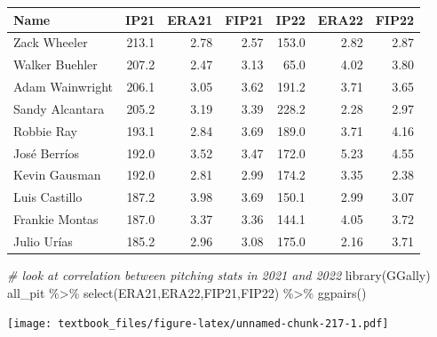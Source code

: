 \documentclass[
  11pt,
]{book}
\newenvironment{Shaded}{\begin{snugshade}}{\end{snugshade}}
\newcommand{\CommentTok}[1]{\textcolor[rgb]{0.56,0.35,0.01}{\textit{#1}}}
\newcommand{\FunctionTok}[1]{\textcolor[rgb]{0.00,0.00,0.00}{#1}}
\newcommand{\NormalTok}[1]{#1}
\newcommand{\SpecialCharTok}[1]{\textcolor[rgb]{0.00,0.00,0.00}{#1}}
\theoremstyle{definition}
\theoremstyle{definition}
\theoremstyle{definition}
\theoremstyle{definition}
\theoremstyle{remark}
\begin{document}
\begin{tabular}{lrrrrrr}
\toprule
Name & IP21 & ERA21 & FIP21 & IP22 & ERA22 & FIP22\\
\midrule
Zack Wheeler & 213.1 & 2.78 & 2.57 & 153.0 & 2.82 & 2.87\\
Walker Buehler & 207.2 & 2.47 & 3.13 & 65.0 & 4.02 & 3.80\\
Adam Wainwright & 206.1 & 3.05 & 3.62 & 191.2 & 3.71 & 3.65\\
Sandy Alcantara & 205.2 & 3.19 & 3.39 & 228.2 & 2.28 & 2.97\\
Robbie Ray & 193.1 & 2.84 & 3.69 & 189.0 & 3.71 & 4.16\\
\addlinespace
José Berríos & 192.0 & 3.52 & 3.47 & 172.0 & 5.23 & 4.55\\
Kevin Gausman & 192.0 & 2.81 & 2.99 & 174.2 & 3.35 & 2.38\\
Luis Castillo & 187.2 & 3.98 & 3.69 & 150.1 & 2.99 & 3.07\\
Frankie Montas & 187.0 & 3.37 & 3.36 & 144.1 & 4.05 & 3.72\\
Julio Urías & 185.2 & 2.96 & 3.08 & 175.0 & 2.16 & 3.71\\
\bottomrule
\end{tabular}

\newpage

\begin{Shaded}
\begin{Highlighting}[]
\CommentTok{\# look at correlation between pitching stats in 2021 and 2022}
\FunctionTok{library}\NormalTok{(GGally)}
\NormalTok{all\_pit }\SpecialCharTok{\%\textgreater{}\%} \FunctionTok{select}\NormalTok{(ERA21,ERA22,FIP21,FIP22) }\SpecialCharTok{\%\textgreater{}\%} \FunctionTok{ggpairs}\NormalTok{()}
\end{Highlighting}
\end{Shaded}

\texttt{[image: textbook\_files/figure-latex/unnamed-chunk-217-1.pdf]}

\newpage
\end{document}
